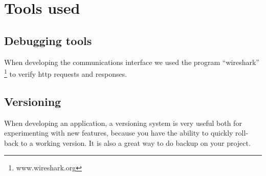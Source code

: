 \section{Tools used}
\subsection{Debugging tools}
When developing the communications interface we used the program ``wireshark'' \footnote{www.wireshark.org} to verify http requests and responses.
\subsection{Versioning}
When developing an application, a versioning system is very useful both for experimenting with new features, because you have the ability to quickly roll-back to a working version. It is also a great way to do backup on your project.




